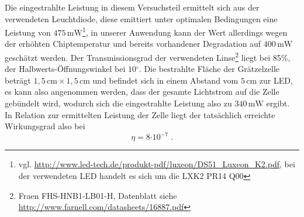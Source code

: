 \documentclass[11pt]{scrartcl}
\newcommand{\unit}[1]{\ensuremath{\,\mathrm{#1}}} %
\newcommand{\degr}{\ensuremath{^\circ}}
\newcommand{\ee}[1]{\ensuremath{\cdot 10^{#1}}}
\begin{document}
Die eingestrahlte Leistung in diesem Versuchsteil ermittelt sich aus der verwendeten Leuchtdiode,
diese emittiert unter optimalen Bedingungen eine Leistung von $475 \unit{mW}$\footnote{vgl. \url{http://www.led-tech.de/produkt-pdf/luxeon/DS51\_Luxeon\_K2.pdf}, bei der verwendeten LED handelt es sich um die LXK2 PR14 Q00}, in unserer Anwendung kann der Wert allerdings wegen der erhöhten Chiptemperatur und bereits vorhandener Degradation auf $400 \unit{mW}$ geschätzt werden.
Der Transmissionsgrad der verwendeten Linse\footnote{Fraen FHS-HNB1-LB01-H, Datenblatt siehe \url{http://www.farnell.com/datasheets/16887.pdf}} liegt bei 85\%, der Halbwerts-Öffnungswinkel bei $10\degr$.
Die bestrahlte Fläche der Grätzelzelle beträgt $1,5 \unit{cm} \times 1,5 \unit{cm}$ und befindet sich in einem Abstand vom $5 \unit{cm}$ zur LED, es kann also angenommen werden, dass der gesamte Lichtstrom auf die Zelle gebündelt wird, wodurch sich die eingestrahlte Leistung also zu $340 \unit{mW}$ ergibt.
In Relation zur ermittelten Leistung der Zelle liegt der tatsächlich erreichte Wirkungsgrad also bei
\[
\boxed{\eta = 8 \ee{-7}} \;.
\]
\end{document}
